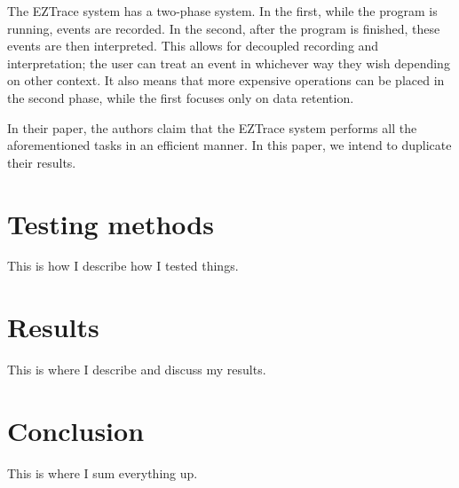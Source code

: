 \documentclass[12pt]{article}
\begin{document}
The EZTrace system has a two-phase system. In the first, while the program is running, events are recorded. In the second, 
after the program is finished, these events are then interpreted. This allows for decoupled recording and interpretation; 
the user can treat an event in whichever way they wish depending on other context. It also means that more expensive 
operations can be placed in the second phase, while the first focuses only on data retention. \cite{Trahay2011}

In their paper, the authors claim that the EZTrace system performs all the aforementioned tasks in an efficient manner. 
In this paper, we intend to duplicate their results.

\section{Testing methods}

This is how I describe how I tested things.

\section{Results}

This is where I describe and discuss my results.

\section{Conclusion}

This is where I sum everything up.



\end{document}

